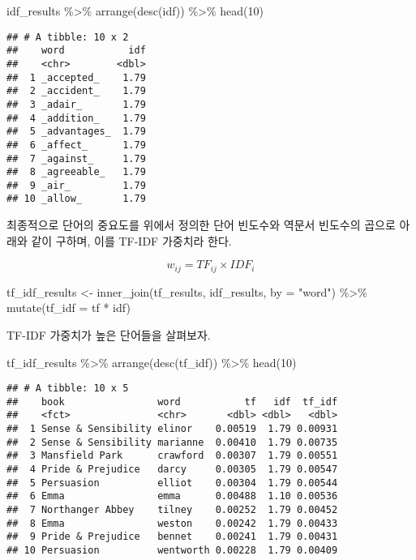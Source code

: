 \documentclass[
]{book}
\newenvironment{Shaded}{\begin{snugshade}}{\end{snugshade}}
\newcommand{\AttributeTok}[1]{\textcolor[rgb]{0.77,0.63,0.00}{#1}}
\newcommand{\DecValTok}[1]{\textcolor[rgb]{0.00,0.00,0.81}{#1}}
\newcommand{\FunctionTok}[1]{\textcolor[rgb]{0.00,0.00,0.00}{#1}}
\newcommand{\NormalTok}[1]{#1}
\newcommand{\OtherTok}[1]{\textcolor[rgb]{0.56,0.35,0.01}{#1}}
\newcommand{\SpecialCharTok}[1]{\textcolor[rgb]{0.00,0.00,0.00}{#1}}
\newcommand{\StringTok}[1]{\textcolor[rgb]{0.31,0.60,0.02}{#1}}
\begin{document}
\begin{Shaded}
\begin{Highlighting}[]
\NormalTok{idf\_results }\SpecialCharTok{\%\textgreater{}\%} \FunctionTok{arrange}\NormalTok{(}\FunctionTok{desc}\NormalTok{(idf)) }\SpecialCharTok{\%\textgreater{}\%} \FunctionTok{head}\NormalTok{(}\DecValTok{10}\NormalTok{)}
\end{Highlighting}
\end{Shaded}

\begin{verbatim}
## # A tibble: 10 x 2
##    word           idf
##    <chr>        <dbl>
##  1 _accepted_    1.79
##  2 _accident_    1.79
##  3 _adair_       1.79
##  4 _addition_    1.79
##  5 _advantages_  1.79
##  6 _affect_      1.79
##  7 _against_     1.79
##  8 _agreeable_   1.79
##  9 _air_         1.79
## 10 _allow_       1.79
\end{verbatim}

최종적으로 단어의 중요도를 위에서 정의한 단어 빈도수와 역문서 빈도수의 곱으로 아래와 같이 구하며, 이를 TF-IDF 가중치라 한다.

\begin{equation*}
w_{ij} = TF_{ij} \times IDF_{i}
\end{equation*}

\begin{Shaded}
\begin{Highlighting}[]
\NormalTok{tf\_idf\_results }\OtherTok{\textless{}{-}} \FunctionTok{inner\_join}\NormalTok{(tf\_results, idf\_results, }\AttributeTok{by =} \StringTok{"word"}\NormalTok{) }\SpecialCharTok{\%\textgreater{}\%}
  \FunctionTok{mutate}\NormalTok{(}\AttributeTok{tf\_idf =}\NormalTok{ tf }\SpecialCharTok{*}\NormalTok{ idf)}
\end{Highlighting}
\end{Shaded}

TF-IDF 가중치가 높은 단어들을 살펴보자.

\begin{Shaded}
\begin{Highlighting}[]
\NormalTok{tf\_idf\_results }\SpecialCharTok{\%\textgreater{}\%}
  \FunctionTok{arrange}\NormalTok{(}\FunctionTok{desc}\NormalTok{(tf\_idf)) }\SpecialCharTok{\%\textgreater{}\%}
  \FunctionTok{head}\NormalTok{(}\DecValTok{10}\NormalTok{)}
\end{Highlighting}
\end{Shaded}

\begin{verbatim}
## # A tibble: 10 x 5
##    book                word           tf   idf  tf_idf
##    <fct>               <chr>       <dbl> <dbl>   <dbl>
##  1 Sense & Sensibility elinor    0.00519  1.79 0.00931
##  2 Sense & Sensibility marianne  0.00410  1.79 0.00735
##  3 Mansfield Park      crawford  0.00307  1.79 0.00551
##  4 Pride & Prejudice   darcy     0.00305  1.79 0.00547
##  5 Persuasion          elliot    0.00304  1.79 0.00544
##  6 Emma                emma      0.00488  1.10 0.00536
##  7 Northanger Abbey    tilney    0.00252  1.79 0.00452
##  8 Emma                weston    0.00242  1.79 0.00433
##  9 Pride & Prejudice   bennet    0.00241  1.79 0.00431
## 10 Persuasion          wentworth 0.00228  1.79 0.00409
\end{verbatim}
\end{document}
